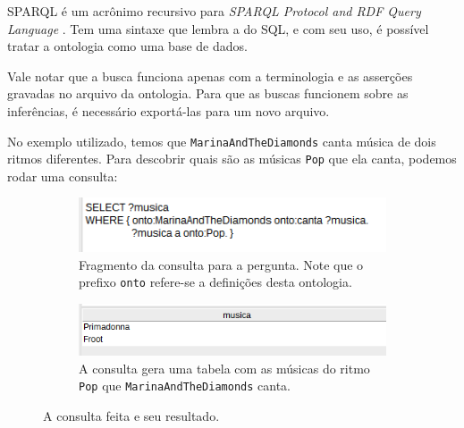 SPARQL é um acrônimo recursivo para \textit{SPARQL Protocol and RDF Query Language} \cite{ferramentasSPARQL}. Tem uma sintaxe que lembra a do SQL, e com seu uso, é possível tratar a ontologia como uma base de dados.  

Vale notar que a busca funciona apenas com a terminologia e as asserções gravadas no arquivo da ontologia. Para que as buscas funcionem sobre as inferências, é necessário exportá-las para um novo arquivo.

No exemplo utilizado, temos que \texttt{MarinaAndTheDiamonds} canta música de dois ritmos diferentes. Para descobrir quais são as músicas \texttt{Pop} que ela canta, podemos rodar uma consulta:

\begin{figure}[H]
	\centering
	\begin{subfigure}{.5\textwidth}
		\centering
		\includegraphics[width=0.95\linewidth]{Capitulos/Ferramentas/query}
		\caption{Fragmento da consulta para a pergunta. Note que o prefixo \texttt{onto} refere-se a definições desta ontologia.}
	\end{subfigure}%
	\begin{subfigure}{.5\textwidth}
		\centering
		\includegraphics[width=0.95\linewidth]{Capitulos/Ferramentas/resultado}
		\caption{A consulta gera uma tabela com as músicas do ritmo \texttt{Pop} que \texttt{MarinaAndTheDiamonds} canta.}
	\end{subfigure}
	\caption{A consulta feita e seu resultado.}
\end{figure}